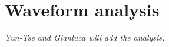 \section{Waveform analysis}
\label{sec:Analysis}

\emph{Yun-Tse and Gianluca will add the analysis.}

